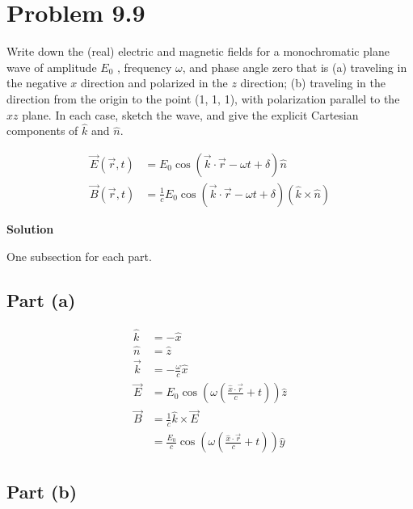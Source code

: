\documentclass[12pt]{article}
\newcommand{\enterProblemHeader}[1]{
	\rhead{#1}
}
\newenvironment{homeworkProblem}[1]{
    \section{Problem #1}
    \enterProblemHeader{#1}
}{
	\pagebreak
}
\newcommand{\solution}{\textbf{\large Solution}}
\begin{document}
\begin{homeworkProblem}{9.9}
	Write down the (real) electric and magnetic fields for a monochromatic plane
	wave of amplitude $E_0$ , frequency $\omega$, and phase angle zero that is
	(a) traveling in the negative $x$ direction and polarized in the $z$
	direction; (b) traveling in the direction from the origin to the point (1,
	1, 1), with polarization parallel to the $xz$ plane. In each case, sketch
	the wave, and give the explicit Cartesian components of $\hat k$ and $\hat
	n$.

	\begin{align*}
		\vec E(\vec r, t) &= E_0 \cos(\vec k \cdot \vec r - \omega t + \delta)
		\hat n\tag{9.51}\\
		\vec B(\vec r, t) &= \frac 1c E_0 \cos(\vec k \cdot \vec r - \omega t +
		\delta) (\hat k \times \hat n)\tag{9.52}
	\end{align*}

	\solution

	One subsection for each part.

	\subsection{Part (a)}

	\begin{align*}
		\hat k &= - \hat x\\
		\hat n &= \hat z\\
		\vec k &= - \frac \omega c \hat x\\
		\vec E &= E_0 \cos \left( \omega \left( \frac {\hat x \cdot \vec r} c +
		t\right) \right) \hat z\\
		\vec B &= \frac 1 c \hat k \times \vec E\\
		&= \frac {E_0} c \cos \left( \omega \left( \frac {\hat x \cdot \vec r} c
		+ t \right) \right) \hat y
	\end{align*}

	\subsection{Part (b)}


\end{homeworkProblem}
\end{document}
